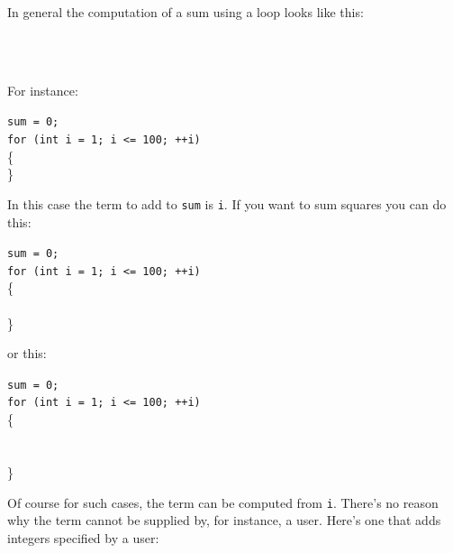 




In general the computation of a sum using a loop looks like this:
\begin{flushleft}
\\
\\
\end{flushleft}
For instance:
\begin{flushleft}
\texttt{sum = 0;}\\
\texttt{for (int i = 1; i <= 100; ++i)}\\
\{
\\
\}
\end{flushleft}
In this case the term to add to \texttt{sum} is \texttt{i}. If you want to
sum squares you can do this:
\begin{flushleft}
\texttt{sum = 0;}\\
\texttt{for (int i = 1; i <= 100; ++i)}\\
\{\\
\\
\}\\
\end{flushleft}
or this:
\begin{flushleft}
\texttt{sum = 0;}\\
\texttt{for (int i = 1; i <= 100; ++i)}\\
\{\\
\\
\\
\}\\
\end{flushleft}
Of course for such cases, the term can be computed from \texttt{i}.
There's no reason why the term cannot be supplied by,
for instance, a user. Here's one that adds integers
specified by a user:
